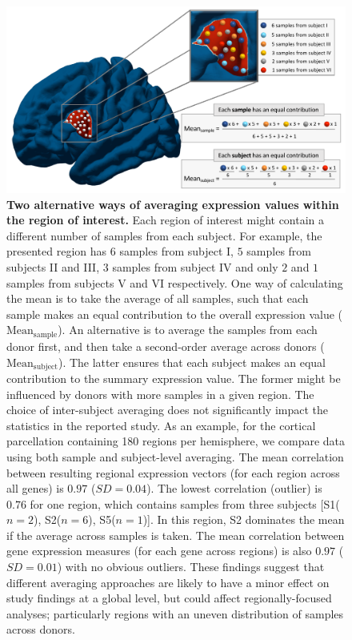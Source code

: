 \documentclass[10pt,A4]{article}
\begin{document}
\begin{figure}[h!]
  \centering
    \includegraphics[width=1\textwidth]{FigureS7.pdf}
\caption{\textbf{Two alternative ways of averaging expression values within the region of interest. }
Each region of interest might contain a different number of samples from each subject. For example, the presented region has $6$ samples from subject I, $5$ samples from subjects II and III, $3$ samples from subject IV and only $2$ and $1$ samples from subjects V and VI respectively. One way of calculating the mean is to take the average of all samples, such that each sample makes an equal contribution to the overall expression value ($\mathrm{Mean_{sample}}$). An alternative is to average the samples from each donor first, and then take a second-order average across donors ($\mathrm{Mean_{subject}}$). The latter ensures that each subject makes an equal contribution to the summary expression value. The former might be influenced by donors with more samples in a given region. The choice of inter-subject averaging does not significantly impact the statistics in the reported study. As an example, for the cortical parcellation containing 180 regions per hemisphere, we compare data using both sample and subject-level averaging. The mean correlation between resulting regional expression vectors (for each region across all genes) is $0.97$ ($SD = 0.04$). The lowest correlation (outlier) is $0.76$ for one region, which contains samples from three subjects [S1($n=2$), S2($n=6$), S5($n=1$)]. In this region, S2 dominates the mean if the average across samples is taken. The mean correlation between gene expression measures (for each gene across regions) is also $0.97$ ($SD = 0.01$) with no obvious outliers. These findings suggest that different averaging approaches are likely to have a minor effect on study findings at a global level, but could affect regionally-focused analyses; particularly regions with an uneven distribution of samples across donors.}
\label{FigS7}
\end{figure}
\end{document}
